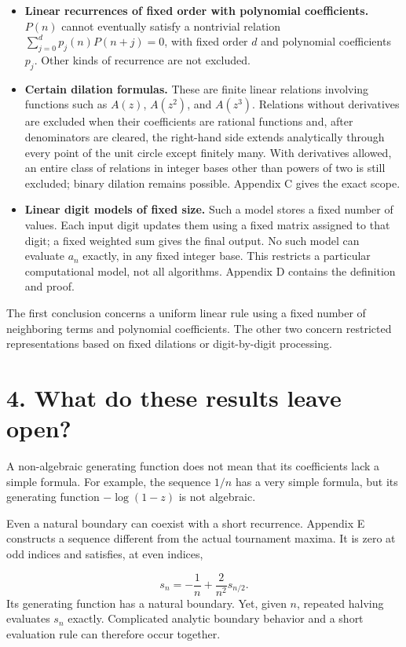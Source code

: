 \documentclass[11pt,a4paper]{article}
\begin{document}
\begin{itemize}[leftmargin=*]
\item \textbf{Linear recurrences of fixed order with polynomial coefficients.} $P(n)$ cannot eventually satisfy a nontrivial relation $\sum_{j=0}^{d}p_j(n)P(n+j)=0$, with fixed order $d$ and polynomial coefficients $p_j$. Other kinds of recurrence are not excluded.
\item \textbf{Certain dilation formulas.} These are finite linear relations involving functions such as $A(z)$, $A(z^2)$, and $A(z^3)$. Relations without derivatives are excluded when their coefficients are rational functions and, after denominators are cleared, the right-hand side extends analytically through every point of the unit circle except finitely many. With derivatives allowed, an entire class of relations in integer bases other than powers of two is still excluded; binary dilation remains possible. Appendix C gives the exact scope.
\item \textbf{Linear digit models of fixed size.} Such a model stores a fixed number of values. Each input digit updates them using a fixed matrix assigned to that digit; a fixed weighted sum gives the final output. No such model can evaluate $a_n$ exactly, in any fixed integer base. This restricts a particular computational model, not all algorithms. Appendix D contains the definition and proof.
\end{itemize}
The first conclusion concerns a uniform linear rule using a fixed number of neighboring terms and polynomial coefficients. The other two concern restricted representations based on fixed dilations or digit-by-digit processing.

\section*{4. What do these results leave open?}
A non-algebraic generating function does not mean that its coefficients lack a simple formula. For example, the sequence $1/n$ has a very simple formula, but its generating function $-\log(1-z)$ is not algebraic.

Even a natural boundary can coexist with a short recurrence. Appendix E constructs a sequence different from the actual tournament maxima. It is zero at odd indices and satisfies, at even indices,

\[
s_n=-\frac1n+\frac{2}{n^2}s_{n/2}.
\]
Its generating function has a natural boundary. Yet, given $n$, repeated halving evaluates $s_n$ exactly. Complicated analytic boundary behavior and a short evaluation rule can therefore occur together.
\end{document}

